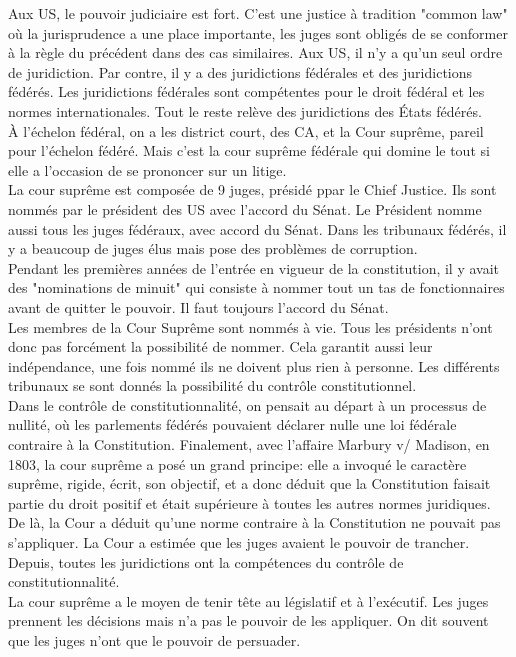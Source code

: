 \documentclass[10pt, a4paper, openany]{book}
\begin{document}
Aux US, le pouvoir judiciaire est fort. C'est une justice à tradition "common law" où la jurisprudence a une place importante, les juges sont obligés de se conformer à la règle du précédent dans des cas similaires. Aux US, il n'y a qu'un seul ordre de juridiction. Par contre, il y a des juridictions fédérales et des juridictions fédérés. Les juridictions fédérales sont compétentes pour le droit fédéral et les normes internationales. Tout le reste relève des juridictions des États fédérés. \\
À l'échelon fédéral, on a les district court, des CA, et la Cour suprême, pareil pour l'échelon fédéré. Mais c'est la cour suprême fédérale qui domine le tout si elle a l'occasion de se prononcer sur un litige. \\
La cour suprême est composée de 9 juges, présidé ppar le Chief Justice. Ils sont nommés par le président des US avec l'accord du Sénat. Le Président nomme aussi tous les juges fédéraux, avec accord du Sénat. Dans les tribunaux fédérés, il y a beaucoup de juges élus mais pose des problèmes de corruption. \\
Pendant les premières années de l'entrée en vigueur de la constitution, il y avait des "nominations de minuit" qui consiste à nommer tout un tas de fonctionnaires avant de quitter le pouvoir. Il faut toujours l'accord du Sénat. \\
Les membres de la Cour Suprême sont nommés à vie. Tous les présidents n'ont donc pas forcément la possibilité de nommer. Cela garantit aussi leur indépendance, une fois nommé ils ne doivent plus rien à personne. Les différents tribunaux se sont donnés la possibilité du contrôle constitutionnel. \\


Dans le contrôle de constitutionnalité, on pensait au départ à un processus de nullité, où les parlements fédérés pouvaient déclarer nulle une loi fédérale contraire à la Constitution. Finalement, avec l'affaire Marbury v/ Madison, en 1803, la cour suprême a posé un grand principe: elle a invoqué le caractère suprême, rigide, écrit, son objectif, et a donc déduit que la Constitution faisait partie du droit positif et était supérieure à toutes les autres normes juridiques. De là, la Cour a déduit qu'une norme contraire à la Constitution ne pouvait pas s'appliquer. La Cour a estimée que les juges avaient le pouvoir de trancher. Depuis, toutes les juridictions ont la compétences du contrôle de constitutionnalité. \\
La cour suprême a le moyen de tenir tête au législatif et à l'exécutif. Les juges prennent les décisions mais n'a pas le pouvoir de les appliquer. On dit souvent que les juges n'ont que le pouvoir de persuader. 
\end{document}

